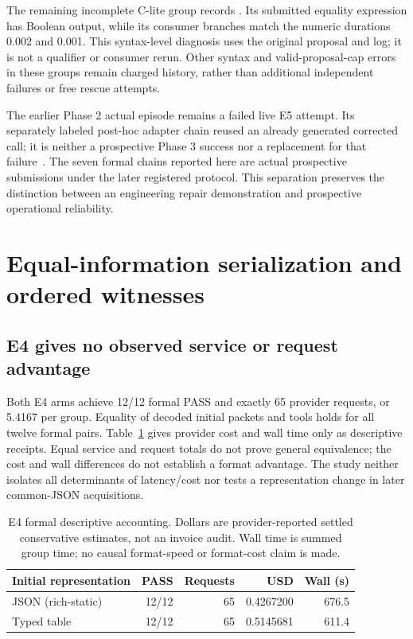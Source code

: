 The remaining incomplete C-lite group records .
Its submitted equality expression has Boolean output, while its consumer
branches match the numeric durations 0.002 and 0.001. This syntax-level
diagnosis uses the original proposal and log; it is not a qualifier or consumer
rerun. Other syntax and valid-proposal-cap errors in these groups remain charged
history, rather than additional independent failures or free rescue attempts.

The earlier Phase 2 actual episode remains a failed live E5 attempt. Its
separately labeled post-hoc adapter chain reused an already generated corrected
call; it is neither a prospective Phase 3 success nor a replacement for that
failure~\cite{phase2}. The seven formal chains reported here are actual
prospective submissions under the later registered protocol. This separation
preserves the distinction between an engineering repair demonstration and
prospective operational reliability.

\section{Equal-information serialization and ordered witnesses}
\subsection{E4 gives no observed service or request advantage}
Both E4 arms achieve 12/12 formal PASS and exactly 65 provider requests,
or 5.4167 per group. Equality of decoded initial packets and tools holds for
all twelve formal pairs. Table~\ref{tab:e4} gives provider cost and wall time
only as descriptive receipts. Equal service and request totals do not prove
general equivalence; the cost and wall differences do not establish a format
advantage. The study neither isolates all determinants of latency/cost nor
tests a representation change in later common-JSON acquisitions.

\begin{table}[htbp]
\centering\small
\caption{E4 formal descriptive accounting. Dollars are provider-reported
settled conservative estimates, not an invoice audit. Wall time is summed
group time; no causal format-speed or format-cost claim is made.}
\label{tab:e4}
\begin{tabular}{@{}lrrrr@{}}\toprule
Initial representation & PASS & Requests & USD & Wall (s) \\\midrule
JSON (rich-static) & 12/12 & 65 & 0.4267200 & 676.5 \\
Typed table & 12/12 & 65 & 0.5145681 & 611.4 \\
\bottomrule\end{tabular}
\end{table}

